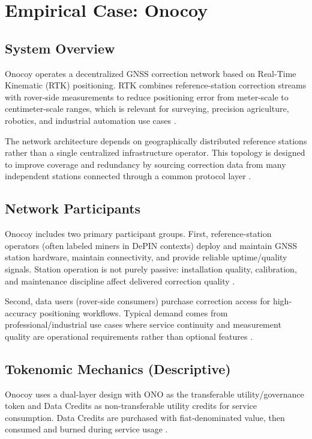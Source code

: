 \section{Empirical Case: Onocoy}
\label{sec:onocoy_case}

\subsection{System Overview}
Onocoy operates a decentralized GNSS correction network based on Real-Time Kinematic (RTK) positioning. RTK combines reference-station correction streams with rover-side measurements to reduce positioning error from meter-scale to centimeter-scale ranges, which is relevant for surveying, precision agriculture, robotics, and industrial automation use cases \cite{OnocoyWhitepaper301}.

The network architecture depends on geographically distributed reference stations rather than a single centralized infrastructure operator. This topology is designed to improve coverage and redundancy by sourcing correction data from many independent stations connected through a common protocol layer \cite{OnocoyWhitepaper301}.

\subsection{Network Participants}
Onocoy includes two primary participant groups. First, reference-station operators (often labeled miners in DePIN contexts) deploy and maintain GNSS station hardware, maintain connectivity, and provide reliable uptime/quality signals. Station operation is not purely passive: installation quality, calibration, and maintenance discipline affect delivered correction quality \cite{OnocoyWhitepaper301, OnocoyRewards}.

Second, data users (rover-side consumers) purchase correction access for high-accuracy positioning workflows. Typical demand comes from professional/industrial use cases where service continuity and measurement quality are operational requirements rather than optional features \cite{OnocoyWhitepaper301}.

\subsection{Tokenomic Mechanics (Descriptive)}
Onocoy uses a dual-layer design with ONO as the transferable utility/governance token and Data Credits as non-transferable utility credits for service consumption. Data Credits are purchased with fiat-denominated value, then consumed and burned during service usage \cite{OnocoyWhitepaper301, OnocoyToken}.

